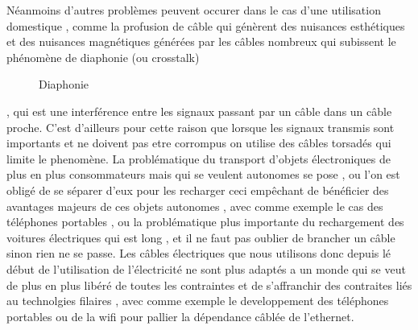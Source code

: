 \documentclass[12pt]{report}
\begin{document}
	Néanmoins d'autres problèmes peuvent occurer dans le cas d'une utilisation domestique , comme la profusion de câble qui génèrent des nuisances esthétiques et des nuisances magnétiques générées par les câbles nombreux qui subissent le phénomène de diaphonie (ou crosstalk)\cite{wiki4}
\begin{figure}
  \begin{center}
    \setlength\fboxsep{0pt}
    \setlength\fboxrule{0.5pt}
  \end{center}
  \caption{Diaphonie}
\end{figure}, qui est une interférence entre les signaux passant par un câble dans un câble proche. C'est d'ailleurs pour cette raison que lorsque les signaux transmis sont importants et ne doivent pas etre corrompus on utilise des câbles torsadés qui limite le phenomène. La problématique du transport d'objets électroniques de plus en plus consommateurs mais qui se veulent autonomes se pose , ou l'on est obligé de se séparer d'eux pour les recharger ceci empêchant de bénéficier des avantages majeurs de ces objets autonomes , avec comme exemple le cas des téléphones portables , ou la problématique plus importante du rechargement des voitures électriques qui est long , et il ne faut pas oublier de brancher un câble sinon rien ne se passe. Les câbles électriques que nous utilisons donc depuis lé  début de l'utilisation de l'électricité ne sont plus adaptés a un monde qui se veut de plus en plus libéré de toutes les contraintes et de s'affranchir des contraites liés au technolgies filaires , avec comme exemple le developpement des téléphones portables ou de la wifi pour pallier la dépendance câblée de l'ethernet.
\end{document}
